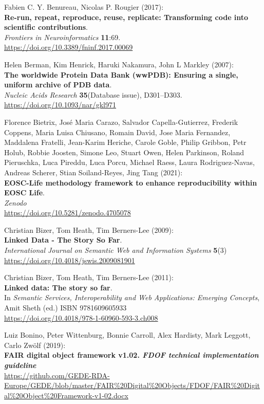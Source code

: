 \begin{thebibliography}{9}
Fabien C. Y. Benureau, Nicolas P. Rougier (2017):\\
\textbf{Re-run, repeat, reproduce, reuse, replicate: Transforming code
into scientific contributions}.\\
\emph{Frontiers in Neuroinformatics} \textbf{11}:69.\\
\url{https://doi.org/10.3389/fninf.2017.00069}

Helen Berman, Kim Henrick, Haruki Nakamura, John L Markley
(2007):\\
\textbf{The worldwide Protein Data Bank (wwPDB): Ensuring a single,
uniform archive of PDB data}.\\
\emph{Nucleic Acids Research} \textbf{35}(Database issue),
D301--D303.\\
\url{https://doi.org/10.1093/nar/gkl971}

Florence Bietrix, José Maria Carazo, Salvador
Capella-Gutierrez, Frederik Coppens, Maria Luisa Chiusano, Romain David,
Jose Maria Fernandez, Maddalena Fratelli, Jean-Karim Heriche, Carole
Goble, Philip Gribbon, Petr Holub, Robbie Joosten, Simone Leo, Stuart
Owen, Helen Parkinson, Roland Pieruschka, Luca Pireddu, Luca Porcu,
Michael Raess, Laura Rodriguez-Navas, Andreas Scherer, Stian
Soiland-Reyes, Jing Tang (2021):\\
\textbf{EOSC-Life methodology framework to enhance reproducibility
within EOSC Life}.\\
\emph{Zenodo}\\
\url{https://doi.org/10.5281/zenodo.4705078}

Christian Bizer, Tom Heath, Tim Berners-Lee (2009):\\
\textbf{Linked Data - The Story So Far}.\\
\emph{International Journal on Semantic Web and Information Systems}
\textbf{5}(3)\\
\url{https://doi.org/10.4018/jswis.2009081901}

Christian Bizer, Tom Heath, Tim Berners-Lee (2011):\\
\textbf{Linked data: The story so far}.\\
In \emph{Semantic Services, Interoperability and Web Applications:
Emerging Concepts}, Amit Sheth (ed.) ISBN 9781609605933\\
\url{https://doi.org/10.4018/978-1-60960-593-3.ch008}

Luiz Bonino, Peter Wittenburg, Bonnie Carroll, Alex
Hardisty, Mark Leggott, Carlo Zwölf (2019):\\
\textbf{FAIR digital object framework v1.02. \emph{FDOF technical
implementation guideline}}\\
\url{https://github.com/GEDE-RDA-Europe/GEDE/blob/master/FAIR\%20Digital\%20Objects/FDOF/FAIR\%20Digital\%20Object\%20Framework-v1-02.docx}


\end{thebibliography}
